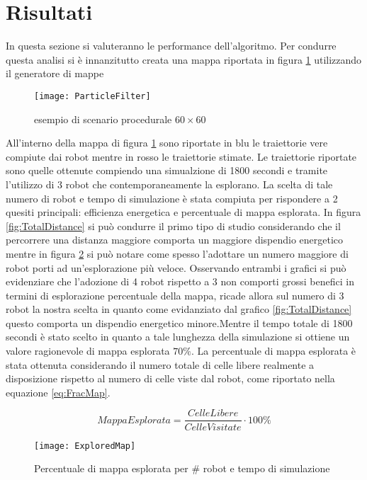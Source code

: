\section{Risultati}
\label{sec:risultati}
In questa sezione si valuteranno le performance dell'algoritmo.
Per condurre questa analisi si è innanzitutto creata una mappa riportata in figura
\ref{fig:dungeon} utilizzando il generatore di mappe 
\begin{figure}[!htb]
	\centering
	\texttt{[image: ParticleFilter]}
	\caption{esempio di scenario procedurale $60\times60$}
\label{fig:dungeon}
\end{figure}
All'interno della mappa di figura \ref{fig:dungeon} sono riportate in blu le traiettorie vere
compiute dai robot mentre in rosso le traiettorie stimate. Le traiettorie riportate sono quelle
ottenute compiendo una simualzione di 1800 secondi e tramite l'utilizzo di 3 robot che 
contemporaneamente la esplorano. La scelta di tale numero di robot e tempo di simulazione 
è stata compiuta per rispondere a 2 quesiti principali: efficienza energetica e percentuale di
mappa esplorata. In figura \ref{fig:TotalDistance} si può condurre il primo tipo di studio 
considerando che il percorrere una distanza maggiore comporta un maggiore dispendio
energetico mentre in figura \ref{fig:ExploredMap} si può notare come spesso l'adottare un 
numero maggiore di robot porti ad un'esplorazione più veloce. Osservando entrambi i grafici 
si può evidenziare che l'adozione di 4 robot rispetto a 3 non comporti grossi benefici in termini di
esplorazione percentuale della mappa, ricade allora sul numero di 3 robot la nostra scelta in
quanto come evidanziato dal grafico \ref{fig:TotalDistance} questo comporta un dispendio energetico 
minore.Mentre il tempo totale di 1800 secondi è stato scelto in quanto a tale lunghezza della 
simulazione si ottiene un valore ragionevole di mappa esplorata $70\%$.
La percentuale di mappa esplorata è stata ottenuta considerando il numero totale di 
celle libere realmente a disposizione rispetto al numero di celle viste dal robot, come riportato
nella equazione \ref{eq:FracMap}.

\begin{equation}
Mappa Esplorata = \frac{Celle Libere}{Celle Visitate} \cdot 100 \%
\label{eq:FracMap}
\end{equation}

\begin{figure}[!htb]
	\centering
	\texttt{[image: ExploredMap]}
	\caption{Percentuale di mappa esplorata per \# robot e tempo di simulazione}
\label{fig:ExploredMap}
\end{figure}

